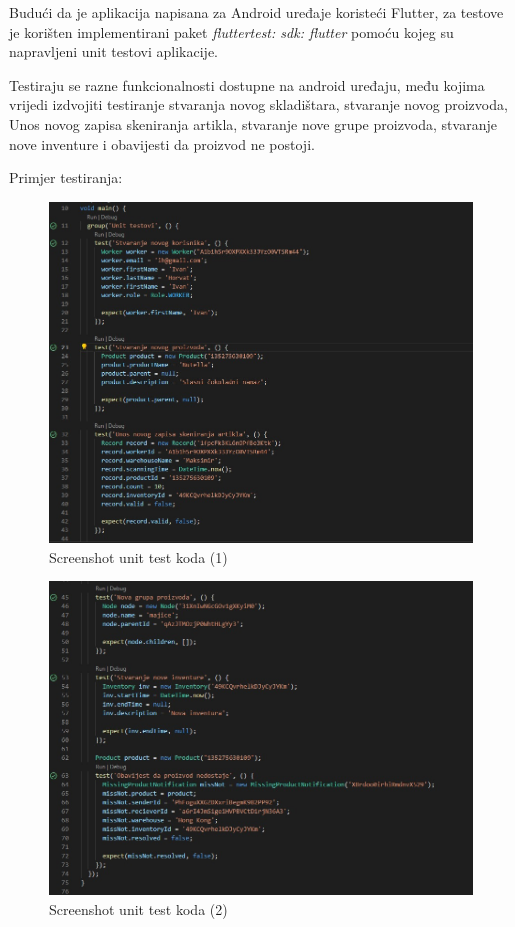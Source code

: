 			Budući da je aplikacija napisana za Android uređaje koristeći Flutter, za testove je korišten implementirani paket \textit{flutter\textunderscore test: sdk: flutter} pomoću kojeg su napravljeni unit testovi aplikacije.
			
			Testiraju se razne funkcionalnosti dostupne na android uređaju, među kojima vrijedi izdvojiti testiranje stvaranja novog skladištara, stvaranje novog proizvoda, Unos novog zapisa skeniranja artikla, stvaranje nove grupe proizvoda, stvaranje nove inventure i obavijesti da proizvod ne postoji.
			
			Primjer testiranja:
			
			\begin{figure}[H]
				\centering
				\includegraphics[width=0.8\linewidth]{"slike/Test1"}
				\caption{Screenshot unit test koda (1)}
				\label{Slika 5.1}
			\end{figure}
			
			\begin{figure}[H]
				\centering
				\includegraphics[width=0.8\linewidth]{"slike/Test2"}
				\caption{Screenshot unit test koda (2)}
				\label{Slika 5.2}
			\end{figure}
			
